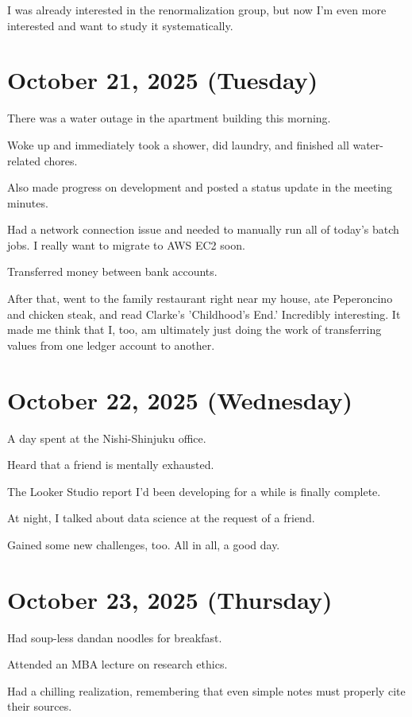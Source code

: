 \documentclass{article}
\begin{document}
I was already interested in the renormalization group, but now I'm even more interested and want to study it systematically.

\section{October 21, 2025 (Tuesday)}

There was a water outage in the apartment building this morning.

Woke up and immediately took a shower, did laundry, and finished all water-related chores.

Also made progress on development and posted a status update in the meeting minutes.

Had a network connection issue and needed to manually run all of today's batch jobs.
I really want to migrate to AWS EC2 soon.

Transferred money between bank accounts.

After that, went to the family restaurant right near my house, ate Peperoncino and chicken steak, and read Clarke's 'Childhood's End.'
Incredibly interesting.
It made me think that I, too, am ultimately just doing the work of transferring values from one ledger account to another.

\section{October 22, 2025 (Wednesday)}

A day spent at the Nishi-Shinjuku office.

Heard that a friend is mentally exhausted.

The Looker Studio report I'd been developing for a while is finally complete.

At night, I talked about data science at the request of a friend.

Gained some new challenges, too. All in all, a good day.

\section{October 23, 2025 (Thursday)}

Had soup-less dandan noodles for breakfast.

Attended an MBA lecture on research ethics.

Had a chilling realization, remembering that even simple notes must properly cite their sources.
\end{document}

